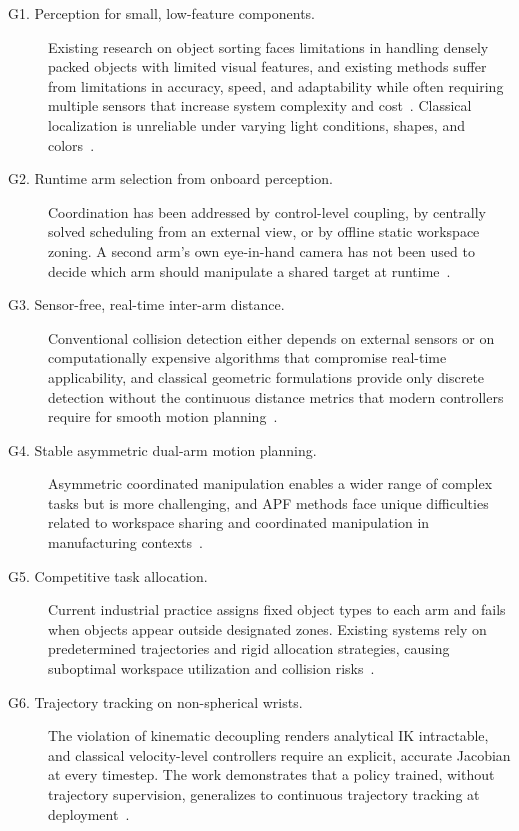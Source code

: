 \begin{description}
    \item[G1. Perception for small, low-feature components.] Existing research on object sorting
    faces limitations in handling densely packed objects with limited visual features, and existing
    methods suffer from limitations in accuracy, speed, and adaptability while often requiring
    multiple sensors that increase system complexity and cost~\citep{sk2024bolthandling}. Classical
    localization is unreliable under varying light conditions, shapes, and
    colors~\citep{sk2024boltsorting}.

    \item[G2. Runtime arm selection from onboard perception.] Coordination has been addressed by
    control-level coupling, by centrally solved scheduling from an external view, or by offline
    static workspace zoning. A second arm's own eye-in-hand camera has not been used to decide which
    arm should manipulate a shared target at runtime~\citep{sk2025sharedvision}.

    \item[G3. Sensor-free, real-time inter-arm distance.] Conventional collision detection either
    depends on external sensors or on computationally expensive algorithms that compromise real-time
    applicability, and classical geometric formulations provide only discrete detection without the
    continuous distance metrics that modern controllers require for smooth motion
    planning~\citep{sk2025distance,surya2025iapf}.

    \item[G4. Stable asymmetric dual-arm motion planning.] Asymmetric coordinated manipulation
    enables a wider range of complex tasks but is more challenging, and APF methods face unique
    difficulties related to workspace sharing and coordinated manipulation in manufacturing
    contexts~\citep{surya2025iapf,sk2025competitive}.

    \item[G5. Competitive task allocation.] Current industrial practice assigns fixed object types
    to each arm and fails when objects appear outside designated zones. Existing systems rely on
    predetermined trajectories and rigid allocation strategies, causing suboptimal workspace
    utilization and collision risks~\citep{sk2025competitive}.

    \item[G6. Trajectory tracking on non-spherical wrists.] The violation of kinematic decoupling
    renders analytical IK intractable, and classical velocity-level controllers require an explicit,
    accurate Jacobian at every timestep. The work demonstrates that a policy trained, without trajectory supervision, generalizes to continuous trajectory
    tracking at deployment~\citep{sk2025diktracking}.


\end{description}
